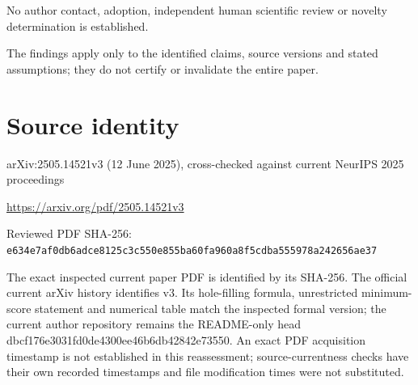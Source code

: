 \documentclass[11pt]{article}
\begin{document}
No author contact, adoption, independent human scientific review or novelty determination is established.\par

The findings apply only to the identified claims, source versions and stated assumptions; they do not certify or invalidate the entire paper.\par

\section*{Source identity}

arXiv:2505.14521v3 (12 June 2025), cross-checked against current NeurIPS 2025 proceedings

\url{https://arxiv.org/pdf/2505.14521v3}

Reviewed PDF SHA-256: \nolinkurl{e634e7af0db6adce8125c3c550e855ba60fa960a8f5cdba555978a242656ae37}

The exact inspected current paper PDF is identified by its SHA-256. The official current arXiv history identifies v3. Its hole-filling formula, unrestricted minimum-score statement and numerical table match the inspected formal version; the current author repository remains the README-only head dbcf176e3031fd0de4300ee46b6db42842e73550. An exact PDF acquisition timestamp is not established in this reassessment; source-currentness checks have their own recorded timestamps and file modification times were not substituted.
\end{document}
